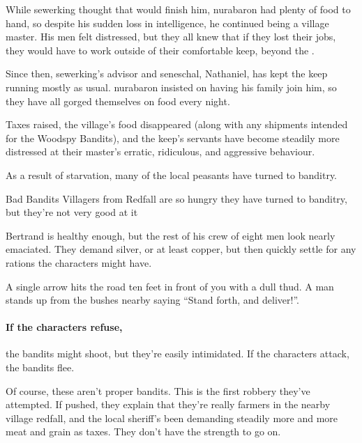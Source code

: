 \begin{multicols}{2}
While \gls{sewerking} thought that would finish him, \gls{nurabaron} had plenty of food to hand, so despite his sudden loss in intelligence, he continued being a village master.
His men felt distressed, but they all knew that if they lost their jobs, they would have to work outside of their comfortable keep, beyond the .

Since then, \gls{sewerking}'s advisor and seneschal, Nathaniel, has kept the keep running mostly as usual.
\Gls{nurabaron} insisted on having his family join him, so they have all gorged themselves on food every night.

Taxes raised, the village's food disappeared (along with any shipments intended for the Woodspy Bandits), and the keep's servants have become steadily more distressed at their master's erratic, ridiculous, and aggressive behaviour.

As a result of starvation, many of the local peasants have turned to banditry.

{\N Bad Bandits}%
{Villagers from Redfall are so hungry they have turned to banditry, but they're not very good at it}%

Bertrand is healthy enough, but the rest of his crew of eight men look nearly emaciated.
They demand silver, or at least copper, but then quickly settle for any rations the characters might have.

\begin{boxtext}

  A single arrow hits the road ten feet in front of you with a dull thud.
  A man stands up from the bushes nearby saying ``Stand forth, and deliver!''.

\end{boxtext}

\paragraph{If the characters refuse,}
the bandits might shoot, but they're easily intimidated.  If the characters attack, the bandits flee.

Of course, these aren't proper bandits.
This is the first robbery they've attempted.
If pushed, they explain that they're really farmers in the nearby village \gls{redfall}, and the local sheriff's been demanding steadily more and more meat and grain as taxes.
They don't have the strength to go on.



\end{multicols}

